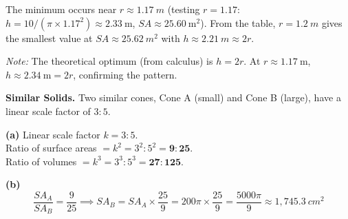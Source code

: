 \documentclass[addpoints]{exam}
\begin{document}
\begin{questions}
\begin{solution}
The minimum occurs near $r \approx \SI{1.17}{m}$ (testing $r = 1.17$: $h = 10/(\pi \times 1.17^2) \approx 2.33\ \text{m}$, $SA \approx 25.60\ \text{m}^2$). From the table, $r = \SI{1.2}{m}$ gives the smallest value at $SA \approx \SI{25.62}{m^2}$ with $h \approx \SI{2.21}{m} \approx 2r$.

\textit{Note:} The theoretical optimum (from calculus) is $h = 2r$. At $r \approx 1.17\ \text{m}$, $h \approx 2.34\ \text{m} = 2r$, confirming the pattern.
\end{solution}

\vspace{5mm}

\question[8]
\textbf{Similar Solids.}
Two similar cones, Cone A (small) and Cone B (large), have a linear scale factor of $3:5$.


\begin{solution}
\textbf{(a)} Linear scale factor $k = 3:5$.\\
Ratio of surface areas $= k^2 = 3^2:5^2 = \mathbf{9:25}$.\\
Ratio of volumes $= k^3 = 3^3:5^3 = \mathbf{27:125}$.

\textbf{(b)}
\[
\frac{SA_A}{SA_B} = \frac{9}{25} \implies SA_B = SA_A \times \frac{25}{9} = 200\pi \times \frac{25}{9} = \frac{5000\pi}{9} \approx 1{,}745.3\ \si{cm^2}
\]


\end{solution}
\end{questions}
\end{document}
